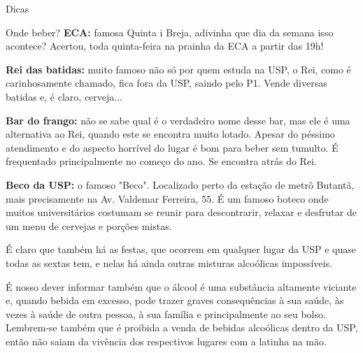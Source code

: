 \begin{secao}{Dicas}
\begin{subsecao}{Onde beber?}
{\bf ECA:} famosa Quinta i Breja, adivinha que dia da semana isso acontece?
Acertou, toda quinta-feira na prainha da ECA a partir das 19h!

{\bf Rei das batidas:} muito famoso não só por quem estuda na USP, o Rei,
como é carinhosamente chamado, fica fora da USP, saindo pelo P1. Vende
diversas batidas e, é claro, cerveja...

{\bf Bar do frango:} não se sabe qual é o verdadeiro nome desse bar, mas ele é
uma alternativa ao Rei, quando este se encontra muito lotado. Apesar do péssimo atendimento
e do aspecto horrível do lugar é bom para beber sem
tumulto. É frequentado principalmente no começo do ano. Se encontra atrás do Rei.

{\bf Beco da USP:} o famoso "Beco". Localizado perto da estação de metrô Butantã, mais precisamente
na Av. Valdemar Ferreira, 55. É um famoso boteco onde muitos universitários costumam se reunir 
para descontrarir, relaxar e desfrutar de um menu de cervejas e porções mistas.

É claro que também há as festas, que ocorrem em qualquer lugar da USP e quase todas as sextas tem, e nelas
há ainda outras misturas alcoólicas impossíveis.

É nosso dever informar também que o álcool é uma substância altamente viciante
e, quando bebida em excesso, pode trazer graves consequências à sua saúde, às
vezes à saúde de outra pessoa, à sua família e principalmente ao seu bolso. Lembrem-se
também que é proibida a venda de bebidas alcoólicas dentro da USP, então
não saiam da vivência dos respectivos lugares com a latinha na mão.

\end{subsecao}
\end{secao}

